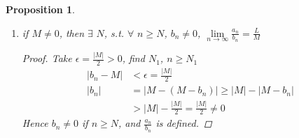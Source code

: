 \documentclass[12pt]{article}
\newcommand{\abs}[1]{\left| #1 \right|}
\theoremstyle{plain}
\newtheorem{proposition}{Proposition}[subsection]
\newcommand{\dlim}{\displaystyle\lim\limits}
\begin{document}
\begin{proposition}
\begin{enumerate}
\begin{proof}
                there is $N_1$ such that for all $n\geq N_1$, $\abs{a_n-L}<\frac{\epsilon}{2\abs{b_n^2+1}}$ 
                
                and there is $N_2$ such that  for all $n\geq N_2$, $\abs{b_n-L}<\frac{\epsilon}{2\abs{L^2+1}}$
                
                therefore, let $N=\max{N_1, N_2}$, for all $n\geq N$, we have 
                \begin{align*}
                    \abs{a_nb_n-LM} &= \abs{a_nb_n-b_nL+b_nL-LM}\\
                    &=\abs{b_n(a_n-L)+L(b_n-M)}\\
                    &\leq \abs{b_n}\abs{a_n-L}+\abs{L}\abs{b_n-M}\\
                    &<\abs{b_n}\cdot \frac{\epsilon}{2\abs{b_n^2+1}}+\abs{b_n}\cdot \frac{\epsilon}{2\abs{L^2+1}}\\
                    &<\frac{\epsilon}2+\frac{\epsilon}2
                    &=\epsilon
                \end{align*}
            
                Hence, by definition of limit, $\dlim_{n\to \infty} a_nb_n=LM$.
            
            \end{proof}
            
            \item if $M \neq 0$, then $\exists\,\, N$, s.t. 
                    $\forall\,\, n\geq N$, $b_n\neq 0$, 
                    $\dlim_{n\to\infty} \frac{a_n}{b_n} = \frac LM$
            \begin{proof}
                Take $\epsilon = \frac{\abs M}2>0$, find $N_1$, $n\geq N_1$
                \begin{align*}
                    \abs{b_n-M} &< \epsilon = \frac{\abs M}2\\ 
                    \abs{b_n} &= \abs{M-(M-b_n)} \geq \abs{M}-\abs{M-b_n}\\
                    &>\abs{M}-\frac{\abs{M}}2 = \frac{\abs{M}}2 \neq 0
                \end{align*}
                Hence $b_n \neq 0$ if $n\geq N$, and $\frac{a_n}{b_n}$ is defined.


\end{proof}
\end{enumerate}
\end{proposition}
\end{document}
